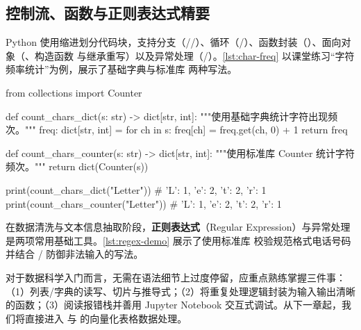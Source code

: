 \subsection{控制流、函数与正则表达式精要}

Python 使用缩进划分代码块，支持分支（//）、循环（/）、函数封装（）、面向对象（、构造函数  与继承重写）以及异常处理（/）。\cref{lst:char-freq} 以课堂练习“字符频率统计”为例，展示了基础字典与标准库  两种写法。

\begin{codeblock}[language=Python,caption={字符频率统计的两种 Python 实现},label=lst:char-freq]
from collections import Counter

def count_chars_dict(s: str) -> dict[str, int]:
    """使用基础字典统计字符出现频次。"""
    freq: dict[str, int] = {}
    for ch in s:
        freq[ch] = freq.get(ch, 0) + 1
    return freq

def count_chars_counter(s: str) -> dict[str, int]:
    """使用标准库 Counter 统计字符频次。"""
    return dict(Counter(s))

print(count_chars_dict("Letter"))     # {'L': 1, 'e': 2, 't': 2, 'r': 1}
print(count_chars_counter("Letter"))  # {'L': 1, 'e': 2, 't': 2, 'r': 1}
\end{codeblock}

在数据清洗与文本信息抽取阶段，\textbf{正则表达式}（Regular Expression）与异常处理是两项常用基础工具。\cref{lst:regex-demo} 展示了使用标准库  校验规范格式电话号码并结合 / 防御非法输入的写法。


\begin{method}\label{met:python-learning}
对于数据科学入门而言，无需在语法细节上过度停留，应重点熟练掌握三件事：（1）列表/字典的读写、切片与推导式；（2）将重复处理逻辑封装为输入输出清晰的函数；（3）阅读报错栈并善用 Jupyter Notebook 交互式调试。从下一章起，我们将直接进入  与  的向量化表格数据处理。
\end{method}

